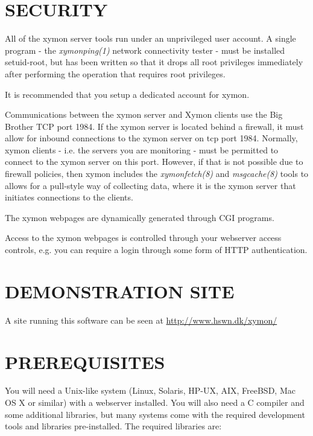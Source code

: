 \section{SECURITY}
 All of the xymon server tools run under an unprivileged user
 account. A single program - the \emph{xymonping(1)} network
 connectivity tester - must be installed setuid-root, but has been
 written so that it drops all root privileges immediately after
 performing the operation that requires root privileges. 

 It is recommended that you setup a dedicated account for xymon. 

 Communications between the xymon server and Xymon clients use the
 Big Brother TCP port 1984. If the xymon server is located behind a
 firewall, it must allow for inbound connections to the xymon server
 on tcp port 1984. Normally, xymon clients - i.e. the servers you
 are monitoring - must be permitted to connect to the xymon server
 on this port. However, if that is not possible due to firewall
 policies, then xymon includes the \emph{xymonfetch(8)} and
 \emph{msgcache(8)} tools to allows for a pull-style way of
 collecting data, where it is the xymon server that initiates
 connections to the clients. 


 The xymon webpages are dynamically generated through CGI programs. 


 Access to the xymon webpages is controlled through your webserver
 access controls, e.g. you can require a login through some form of
 HTTP authentication. 

 
\section{DEMONSTRATION SITE}
 A site running this software can be seen at \url{http://www.hswn.dk/xymon/}

 
\section{PREREQUISITES}

 You will need a Unix-like system (Linux, Solaris, HP-UX, AIX,
 FreeBSD, Mac OS X or similar) with a webserver installed. You will
 also need a C compiler and some additional libraries, but many
 systems come with the required development tools and libraries
 pre-installed. The required libraries are: 


